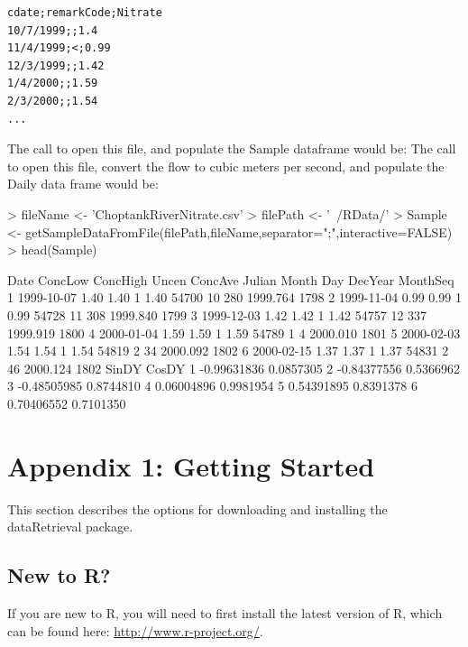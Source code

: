 \documentclass[a4paper,11pt]{article}
\begin{document}
\begin{verbatim}
cdate;remarkCode;Nitrate
10/7/1999;;1.4
11/4/1999;<;0.99
12/3/1999;;1.42
1/4/2000;;1.59
2/3/2000;;1.54
...
\end{verbatim}
The call to open this file, and populate the Sample dataframe would be:
The call to open this file, convert the flow to cubic meters per second, and populate the Daily data frame would be:
\begin{Schunk}
\begin{Sinput}
> fileName <- 'ChoptankRiverNitrate.csv'
> filePath <-  '~/RData/'
> Sample <- getSampleDataFromFile(filePath,fileName,separator=";",interactive=FALSE)
> head(Sample)
\end{Sinput}
\begin{Soutput}
        Date ConcLow ConcHigh Uncen ConcAve Julian Month Day  DecYear MonthSeq
1 1999-10-07    1.40     1.40     1    1.40  54700    10 280 1999.764     1798
2 1999-11-04    0.99     0.99     1    0.99  54728    11 308 1999.840     1799
3 1999-12-03    1.42     1.42     1    1.42  54757    12 337 1999.919     1800
4 2000-01-04    1.59     1.59     1    1.59  54789     1   4 2000.010     1801
5 2000-02-03    1.54     1.54     1    1.54  54819     2  34 2000.092     1802
6 2000-02-15    1.37     1.37     1    1.37  54831     2  46 2000.124     1802
        SinDY     CosDY
1 -0.99631836 0.0857305
2 -0.84377556 0.5366962
3 -0.48505985 0.8744810
4  0.06004896 0.9981954
5  0.54391895 0.8391378
6  0.70406552 0.7101350
\end{Soutput}
\end{Schunk}




\newpage
\section{Appendix 1: Getting Started}
This section describes the options for downloading and installing the dataRetrieval package.

\subsection{New to R?}
If you are new to R, you will need to first install the latest version of R, which can be found here: \url{http://www.r-project.org/}.
\end{document}

